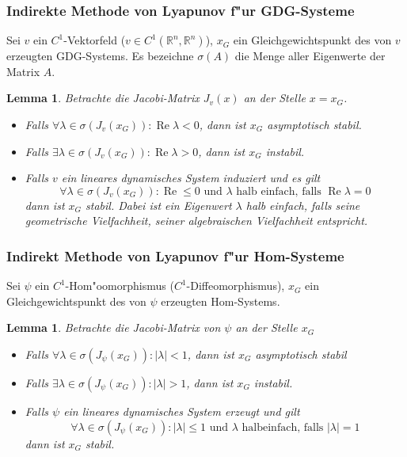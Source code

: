 \documentclass[a4paper, 13pt]{scrreprt}
\newtheorem{lemma}[theorem]{Lemma}
\theoremstyle{definition} \newtheorem{definition}{Definition}[section]
\begin{document}
\subsubsection{Indirekte Methode von Lyapunov f"ur GDG-Systeme}
Sei $v$ ein $C^1$-Vektorfeld ($v\in C^1(\mathbb{R}^n, \mathbb{R}^n)$), $x_G$ ein Gleichgewichtspunkt des von $v$ erzeugten GDG-Systems. Es bezeichne $\sigma(A)$ die Menge aller Eigenwerte der Matrix $A$.
\begin{lemma}
Betrachte die Jacobi-Matrix $J_v(x)$ an der Stelle $x = x_G$.
\begin{itemize}
\item Falls $\forall \lambda \in \sigma(J_v(x_G)): \operatorname{Re} \lambda < 0$, dann ist $x_G$ asymptotisch stabil.
\item Falls $\exists \lambda \in \sigma(J_v(x_G)): \operatorname{Re} \lambda > 0$, dann ist $x_G$ instabil.
\item Falls $v$ ein lineares dynamisches System induziert und es gilt 
$$ \forall \lambda \in \sigma(J_v(x_G)): \operatorname{Re} \leq 0 \mbox { und } \lambda \mbox{ halb einfach, falls } \operatorname{Re} \lambda = 0$$
dann ist $x_G$ stabil. Dabei ist ein Eigenwert $\lambda$ \emph{halb einfach}, falls seine geometrische Vielfachheit, seiner algebraischen Vielfachheit entspricht.
\end{itemize}
\end{lemma}
\subsubsection{Indirekt Methode von Lyapunov f"ur Hom-Systeme}
Sei $\psi $ ein $C^1$-Hom"oomorphismus ($C^1$-Diffeomorphismus), $x_G$ ein Gleichgewichtspunkt des von $\psi$ erzeugten Hom-Systems.
\begin{lemma}
Betrachte die Jacobi-Matrix von $\psi$ an der Stelle $x_G$
\begin{itemize}
\item Falls $\forall \lambda \in \sigma(J_\psi(x_G)): |\lambda| < 1$, dann ist $x_G$ asymptotisch stabil
\item Falls $\exists \lambda \in \sigma(J_\psi(x_G)): |\lambda| > 1$, dann ist $x_G$ instabil.
\item Falls $\psi$ ein lineares dynamisches System erzeugt und gilt 
$$\forall \lambda \in \sigma(J_\psi(x_G)): |\lambda| \leq 1 \mbox{ und } \lambda \mbox{ halbeinfach, falls } |\lambda| = 1$$
dann ist $x_G$ stabil.
\end{itemize}
\end{lemma}
\end{document}
